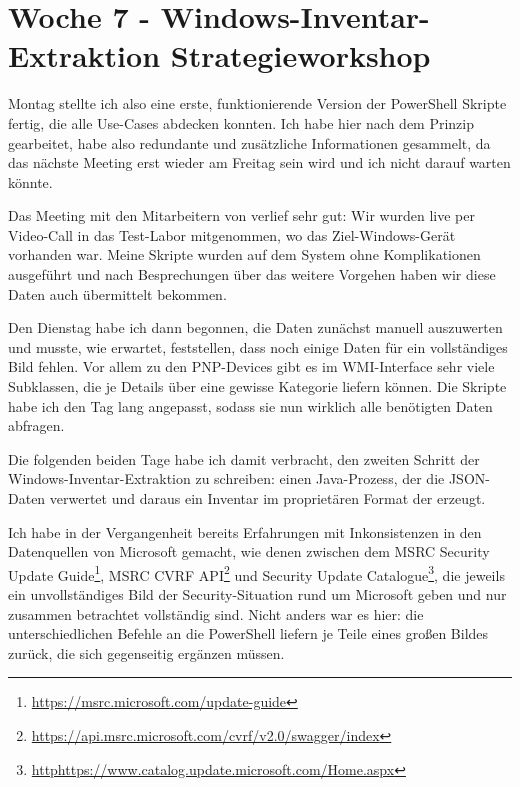\section{Woche 7 - Windows-Inventar-Extraktion \headerand Strategieworkshop} \label{sec:bericht-wo-7}


\lweekdaymarginpar{\weekdayMondayLong}

Montag stellte ich also eine erste, funktionierende Version der PowerShell Skripte fertig, die alle Use-Cases abdecken konnten.
Ich habe hier nach dem Prinzip  gearbeitet, habe also redundante und zusätzliche Informationen gesammelt, da das nächste Meeting erst wieder am Freitag sein wird und ich nicht darauf warten könnte.

Das Meeting mit den Mitarbeitern von {\aeclientZEZESE} verlief sehr gut:
Wir wurden live per Video-Call in das Test-Labor mitgenommen, wo das Ziel-Windows-Gerät vorhanden war.
Meine Skripte wurden auf dem System ohne Komplikationen ausgeführt und nach Besprechungen über das weitere Vorgehen haben wir diese Daten auch übermittelt bekommen.

\sweekdaymarginpar{\weekdayTuesdayLong}

Den Dienstag habe ich dann begonnen, die Daten zunächst manuell auszuwerten und musste, wie erwartet, feststellen, dass noch einige Daten für ein vollständiges Bild fehlen.
Vor allem zu den PNP-Devices gibt es im WMI-Interface sehr viele Subklassen, die je Details über eine gewisse Kategorie liefern können.
Die Skripte habe ich den Tag lang angepasst, sodass sie nun wirklich alle benötigten Daten abfragen.

\sweekdaymarginpar{\weekdayWednesdayShort, \weekdayThursdayShort}

Die folgenden beiden Tage habe ich damit verbracht, den zweiten Schritt der Windows-Inventar-Extraktion zu schreiben:
einen Java-Prozess, der die JSON-Daten verwertet und daraus ein Inventar im proprietären Format der {\metaeffekt} erzeugt.

Ich habe in der Vergangenheit bereits Erfahrungen mit Inkonsistenzen in den Datenquellen von Microsoft gemacht, wie denen zwischen dem
MSRC Security Update Guide\footnote{\url{https://msrc.microsoft.com/update-guide}},
MSRC CVRF API\footnote{\url{https://api.msrc.microsoft.com/cvrf/v2.0/swagger/index}} und
Security Update Catalogue\footnote{\url{httphttps://www.catalog.update.microsoft.com/Home.aspx}},
die jeweils ein unvollständiges Bild der Security-Situation rund um Microsoft geben und nur zusammen betrachtet vollständig sind.
Nicht anders war es hier:
die unterschiedlichen Befehle an die PowerShell liefern je Teile eines großen Bildes zurück, die sich gegenseitig ergänzen müssen.

